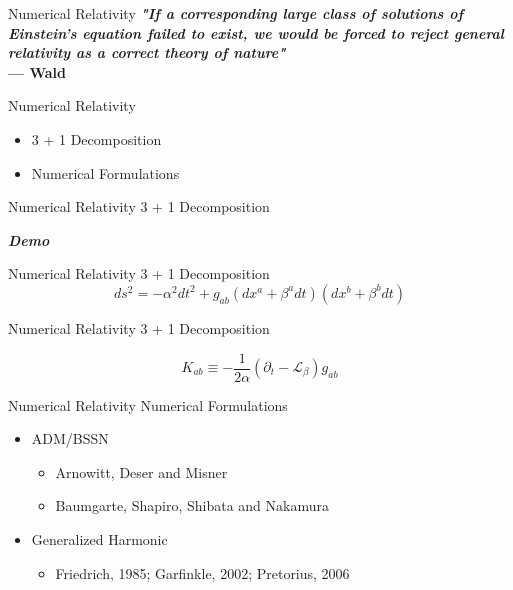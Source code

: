 \documentclass[xcolor=dvipsnames]{beamer}
\begin{document}
	\begin{frame}{Numerical Relativity}
		\textbf{\textit{"If a corresponding large class of solutions of Einstein’s equation failed to exist, we would be forced to reject general relativity as a correct theory of nature"}}\\
		\hfill \textbf{--- Wald}
	\end{frame}
	\begin{frame}{Numerical Relativity}
		\begin{itemize}
			\item{3 + 1 Decomposition}
			\item{Numerical Formulations}
		\end{itemize}
	\end{frame}
	\begin{frame}{Numerical Relativity}
		3 + 1 Decomposition
		\begin{center}
			\Huge{\textbf{\textit{Demo}}}
		\end{center}
	\end{frame}
	\begin{frame}{Numerical Relativity}
		3 + 1 Decomposition
		\Large
		\[
		ds^{2} = - \alpha^{2}dt^{2} + g_{ab}(dx^{a} + \beta^{a}dt)(dx^{b} + \beta^{b}dt) 		
		\]
	\end{frame}
	\begin{frame}{Numerical Relativity}
		3 + 1 Decomposition
		\begin{center}
			\Large
			\[
			K_{ab} \equiv -\frac{1}{2\alpha}\left(\partial_{t} - \mathcal{L}_{\beta}\right)g_{ab}
			\]
		\end{center}
	\end{frame}
	\begin{frame}{Numerical Relativity}
		Numerical Formulations
		\begin{itemize}
			\pause
			\item{ADM/BSSN}
			\pause
			\begin{itemize}
				\item{Arnowitt, Deser and Misner}
			\pause
				\item{Baumgarte, Shapiro, Shibata and Nakamura}
			\end{itemize}
			\pause
			\item{Generalized Harmonic}
			\pause
			\begin{itemize}
				\item{Friedrich, 1985; Garfinkle, 2002; Pretorius, 2006}
			\end{itemize}
		\end{itemize}
	\end{frame}
\end{document}
